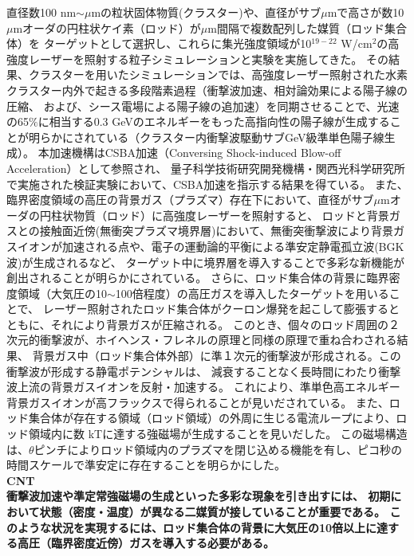 \documentclass[a4paper,11pt,titlepage]{jsarticle}
\begin{document}
  直径数100 nm$\sim$$\mu$mの粒状固体物質(クラスター)や、直径がサブ$\mu$mで高さが数10$\mu$mオーダの円柱状ケイ素（ロッド）が$\mu$m間隔で複数配列した媒質（ロッド集合体）を
  ターゲットとして選択し、これらに集光強度領域が10$^{19-22}$ W/cm$^{2}$の高強度レーザーを照射する粒子シミュレーションと実験を実施してきた。
  その結果、クラスターを用いたシミュレーションでは、高強度レーザー照射された水素クラスター内外で起きる多段階素過程（衝撃波加速、相対論効果による陽子線の圧縮、
  および、シース電場による陽子線の追加速）を同期させることで、光速の65$\%$に相当する0.3 GeVのエネルギーをもった高指向性の陽子線が生成することが明らかにされている（クラスター内衝撃波駆動サブGeV級準単色陽子線生成）。
  \cite{m7}本加速機構はCSBA加速（Conversing Shock-induced Blow-off Acceleration）として参照され、
  量子科学技術研究開発機構・関西光科学研究所で実施された検証実験において、CSBA加速を指示する結果を得ている。\cite{matsui}
  また、臨界密度領域の高圧の背景ガス（プラズマ）存在下において、直径がサブ$\mu$mオーダの円柱状物質（ロッド）に高強度レーザーを照射すると、
  ロッドと背景ガスとの接触面近傍(無衝突プラズマ境界層)において、無衝突衝撃波により背景ガスイオンが加速される点や、電子の運動論的平衡による準安定静電孤立波(BGK波)が生成されるなど、
  ターゲット中に境界層を導入することで多彩な新機能が創出されることが明らかにされている。
  さらに、ロッド集合体の背景に臨界密度領域（大気圧の10$\sim$100倍程度）の高圧ガスを導入したターゲットを用いることで、
  レーザー照射されたロッド集合体がクーロン爆発を起こして膨張するとともに、それにより背景ガスが圧縮される。
  このとき、個々のロッド周囲の２次元的衝撃波が、ホイヘンス・フレネルの原理と同様の原理で重ね合わされる結果、
  背景ガス中（ロッド集合体外部）に準１次元的衝撃波が形成される。この衝撃波が形成する静電ポテンシャルは、
  減衰することなく長時間にわたり衝撃波上流の背景ガスイオンを反射・加速する。\cite{uehara}
  これにより、準単色高エネルギー背景ガスイオンが高フラックスで得られることが見いだされている。
  また、ロッド集合体が存在する領域（ロッド領域）の外周に生じる電流ループにより、ロッド領域内に数 kTに達する強磁場が生成することを見いだした。
  この磁場構造は、$\theta$ピンチによりロッド領域内のプラズマを閉じ込める機能を有し、ピコ秒の時間スケールで準安定に存在することを明らかにした。\cite{IFSA}\\
  \bf{CNT}\\
  \rm
  衝撃波加速や準定常強磁場の生成といった多彩な現象を引き出すには、
  初期において状態（密度・温度）が異なる二媒質が接していることが重要である。
  このような状況を実現するには、ロッド集合体の背景に大気圧の10倍以上に達する高圧（臨界密度近傍）ガスを導入する必要がある。
$$
\end{document}
